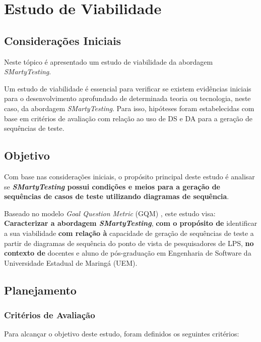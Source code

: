 \chapter{Estudo de Viabilidade}
\label{cap4:avaliacao}
\pagestyle{plain}

\section{Considerações Iniciais}
Neste tópico é apresentado um estudo de viabilidade da abordagem \textit{SMartyTesting}.

Um estudo de viabilidade é essencial para verificar se existem evidências iniciais para o desenvolvimento aprofundado de determinada teoria ou tecnologia, neste caso, da abordagem \textit{SMartyTesting}. Para isso, hipóteses foram estabelecidas com base em critérios de avaliação com relação ao uso de DS e DA para a geração de sequências de teste.

\section{Objetivo}
\label{cap4sec:objetivos_avaliacao}
Com base nas considerações iniciais, o propósito principal deste estudo é analisar se \textbf{\textit{SMartyTesting} possui condições e meios para a geração de sequências de casos de teste utilizando diagramas de sequência}. 

Baseado no modelo \textit{Goal Question Metric} (GQM) \cite{basili1992software}, este estudo visa: \textbf{Caracterizar a abordagem \textit{SMartyTesting}}, \textbf{com o propósito de} identificar a sua viabilidade \textbf{com relação à} capacidade de geração de sequências de teste a partir de diagramas de sequência do ponto de vista de pesquisadores de LPS, \textbf{no contexto de} docentes e aluno de pós-graduação em Engenharia de Software da Universidade Estadual de Maringá (UEM).


\section{Planejamento}
\label{cap4sec:planejamento_avaliacao}

\subsection{Critérios de Avaliação}
\label{cap4subsec:criterios}
Para alcançar o objetivo deste estudo, foram definidos os seguintes critérios:


